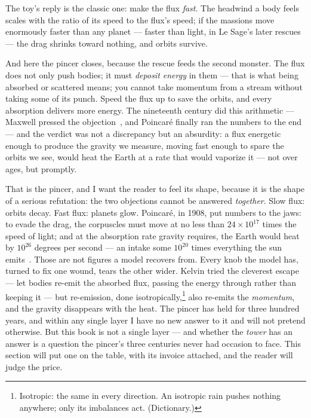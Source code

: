 \documentclass[fontsize=11pt,paper=a4,pagesize=auto,parskip=half-]{scrbook}
\newcommand{\Ixtmp}{}
\DeclareRobustCommand{\Ix}[1]{%
  #1%
  \begingroup
    \lowercase{\gdef\Ixtmp{#1}}%
    \expandafter\index\expandafter{\Ixtmp}%
  \endgroup}
\newcommand{\Iy}[1]{#1\index{#1}}
\begin{document}
The toy's reply is the classic one: make the flux \emph{fast}. The headwind a body feels scales with the ratio of its speed to the flux's speed; if the massions move enormously faster than any planet --- faster than light, in \Iy{Le Sage}'s later rescues --- the drag shrinks toward nothing, and orbits survive.

And here the \Ix{pincer} closes, because the rescue feeds the second monster. The flux does not only push bodies; it must \emph{deposit energy} in them --- that is what being absorbed or scattered means; you cannot take momentum from a stream without taking some of its punch. Speed the flux up to save the orbits, and every absorption delivers more energy. The nineteenth century did this arithmetic --- \Iy{Maxwell} pressed the objection~\cite{maxwell1875}, and Poincaré finally ran the numbers to the end~\cite[517--522]{poincare1908} --- and the verdict was not a discrepancy but an absurdity: a flux energetic enough to produce the gravity we measure, moving fast enough to spare the orbits we see, would heat the Earth at a rate that would vaporize it --- not over ages, but promptly.

That is the pincer, and I want the reader to feel its shape, because it is the shape of a serious refutation: the two objections cannot be answered \emph{together}. Slow flux: orbits decay. Fast flux: planets glow. \Iy{Poincar\'e}, in 1908, put numbers to the jaws: to evade the drag, the corpuscles must move at no less than $24\times10^{17}$ times the speed of light; and at the absorption rate gravity requires, the Earth would heat by $10^{26}$ degrees per second --- an intake some $10^{20}$ times everything the sun emits~\cite[517--522]{poincare1908}. Those are not figures a model recovers from. Every knob the model has, turned to fix one wound, tears the other wider. Kelvin tried the cleverest escape --- let bodies re-emit the absorbed flux, passing the energy through rather than keeping it --- but re-emission, done isotropically,\footnote{Isotropic: the same in every direction. An isotropic rain pushes nothing anywhere; only its imbalances act. (Dictionary.)} also re-emits the \emph{momentum}, and the gravity disappears with the heat. The pincer has held for three hundred years, and within any single layer I have no new answer to it and will not pretend otherwise. But this book is not a single layer --- and whether the \emph{tower} has an answer is a question the pincer's three centuries never had occasion to face. This section will put one on the table, with its invoice attached, and the reader will judge the price.
\end{document}
